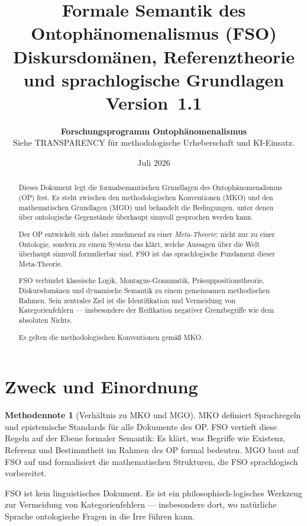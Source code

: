 \documentclass[11pt,a4paper]{article}
\title{
  \textbf{Formale Semantik des Ontoph\"{a}nomenalismus (FSO)}\\[0.4em]
  {\large Diskursdom\"{a}nen, Referenztheorie und sprachlogische Grundlagen}\\[0.5em]
  {\normalsize Version~1.1}
}
\author{
  \textbf{Forschungsprogramm Ontoph\"{a}nomenalismus}\\
  \small Siehe TRANSPARENCY f\"{u}r methodologische Urheberschaft und KI-Einsatz.
}
\date{Juli 2026}
\theoremstyle{plain}
\theoremstyle{definition}
\newtheorem{methodennote}{Methodennote}[section]
\begin{document}
\maketitle

\begin{abstract}
Dieses Dokument legt die formalsemantischen Grundlagen des Ontoph\"{a}nomenalismus (OP)
fest. Es steht zwischen den methodologischen Konventionen (MKO) und den mathematischen
Grundlagen (MGO) und behandelt die Bedingungen, unter denen \"{u}ber ontologische
Gegenst\"{a}nde \"{u}berhaupt sinnvoll gesprochen werden kann.

Der OP entwickelt sich dabei zunehmend zu einer \emph{Meta-Theorie}: nicht nur zu
einer Ontologie, sondern zu einem System das kl\"{a}rt, welche Aussagen \"{u}ber die
Welt \"{u}berhaupt sinnvoll formulierbar sind. FSO ist das sprachlogische Fundament
dieser Meta-Theorie.

FSO verbindet klassische Logik, Montague-Grammatik, Pr\"{a}suppositionstheorie,
Diskursdom\"{a}nen und dynamische Semantik zu einem gemeinsamen methodischen Rahmen.
Sein zentrales Ziel ist die Identifikation und Vermeidung von Kategorienfehlern ---
insbesondere der Reifikation negativer Grenzbegriffe wie dem \glqq{}absoluten
Nichts\grqq{}.

Es gelten die methodologischen Konventionen gem\"{a}\ss{} MKO.
\end{abstract}

\tableofcontents
\newpage

\section{Zweck und Einordnung}

\begin{methodennote}[Verh\"{a}ltnis zu MKO und MGO]
MKO definiert Sprachregeln und epistemische Standards f\"{u}r alle Dokumente des OP.
FSO vertieft diese Regeln auf der Ebene formaler Semantik: Es kl\"{a}rt, was Begriffe
wie \glqq{}Existenz\grqq{}, \glqq{}Referenz\grqq{} und \glqq{}Bestimmtheit\grqq{} im
Rahmen des OP formal bedeuten. MGO baut auf FSO auf und formalisiert die
mathematischen Strukturen, die FSO sprachlogisch vorbereitet.

FSO ist kein linguistisches Dokument. Es ist ein philosophisch-logisches Werkzeug
zur Vermeidung von Kategorienfehlern --- insbesondere dort, wo nat\"{u}rliche Sprache
ontologische Fragen in die Irre f\"{u}hren kann.
\end{methodennote}
\end{document}
